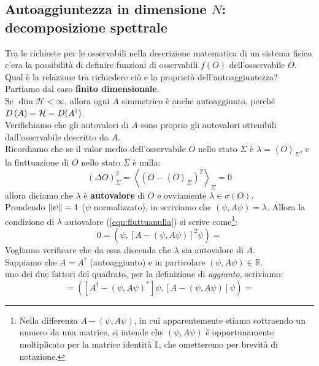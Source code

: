 \subsection{Autoaggiuntezza in dimensione $N$: decomposizione spettrale}
Tra le richieste per le osservabili nella descrizione matematica di un sistema fisico c'era la possibilità di definire funzioni di osservabili $f(O)$ dell'osservabile $O$. Qual è la relazione tra richiedere ciò e la proprietà dell'autoaggiuntezza?\\

Partiamo dal caso \textbf{finito dimensionale}.\\
Se $\dim{\mathcal{H}<\infty}$, allora ogni $A$ simmetrico è anche autoaggiunto, perché $D\left(A\right)= \mathcal{H} = D(A^\dag)$.\\
Verifichiamo che gli autovalori di $A$ sono proprio gli autovalori ottenibili dall'osservabile descritto da $A$.\\
Ricordiamo che se il valor medio dell'osservabile $O$ nello stato $\Sigma$ è $\lambda=\left\langle O\right\rangle_\Sigma$, e la fluttuazione di $O$ nello stato $\Sigma$ è nulla:
\begin{equation}
\left(\Delta O\right)_\Sigma^2=\left\langle\left(O-\left\langle O\right\rangle_\Sigma\right)^2\right\rangle_\Sigma=0
\label{eqn:fluttuanulla}
\end{equation}
allora diciamo che $\lambda$ è \textbf{autovalore} di $O$ e ovviamente  $\lambda \in \sigma \left(O\right)$.\\
Prendendo $\left\lVert\psi\right\rVert=1$ ($\psi$ normalizzato), in \MQ scriviamo che $(\psi,A\psi) = \lambda$. Allora la condizione di $\lambda$ autovalore (\ref{eqn:fluttuanulla}) si scrive come\footnote{Nella differenza $A-(\psi,A\psi)$, in cui apparentemente stiamo sottraendo un numero da una matrice, si intende che $(\psi,A\psi)$ è opportunamente moltiplicato per la matrice identità $\mathbb{I}$, che ometteremo per brevità di notazione.}:
\[
0=\left(\psi, \left[A-\left(\psi,A\psi\right)\right]^2\psi\right) =
\]
Vogliamo verificare che da essa discenda che $\lambda$ sia autovalore di $A$.\\
Sappiamo che $A=A^\dag$ (autoaggiunto) e in particolare $\left(\psi,A\psi\right)\in\mathbb{R}$.\\
 uno dei due fattori del quadrato, per la definizione di \textit{aggiunto}, scriviamo:
\[
=\left(\left[A^\dag-\left(\psi,A\psi\right)^*\right]\psi, \left[A-\left(\psi,A\psi\right)\right]\psi\right)=
\]
